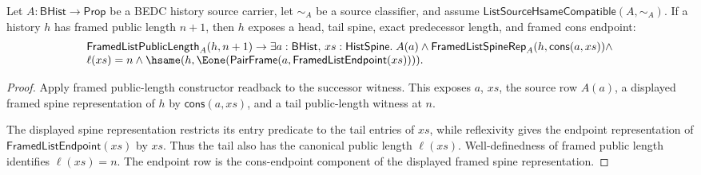 \begin{theorem}
\label{thm:list-public-length-successor-endpoint-readback}
Let $A:\mathsf{BHist}\to\mathsf{Prop}$ be a BEDC history source carrier, let
$\sim_A$ be a source classifier, and assume
$\mathsf{ListSourceHsameCompatible}(A,\sim_A)$. If a history $h$ has framed
public length \(n+1\), then \(h\) exposes a head, tail spine, exact predecessor
length, and framed cons endpoint:
$$
\begin{array}{l}
\mathsf{FramedListPublicLength}_A(h,n+1)\to
\exists a:\mathsf{BHist},\,xs:\mathsf{HistSpine}.\;
A(a)\land
\mathsf{FramedListSpineRep}_A(h,\mathsf{cons}(a,xs))\land\\
\ell(xs)=n\land
\hsame(h,\Eone(\mathsf{PairFrame}(a,\mathsf{FramedListEndpoint}(xs)))).
\end{array}
$$
\end{theorem}
\begin{proof}
Apply framed public-length constructor readback to the successor witness. This
exposes \(a\), \(xs\), the source row \(A(a)\), a displayed framed spine
representation of \(h\) by \(\mathsf{cons}(a,xs)\), and a tail public-length
witness at \(n\).

The displayed spine representation restricts its entry predicate to the tail
entries of \(xs\), while reflexivity gives the endpoint representation of
\(\mathsf{FramedListEndpoint}(xs)\) by \(xs\). Thus the tail also has the
canonical public length \(\ell(xs)\). Well-definedness of framed public length
identifies \(\ell(xs)=n\). The endpoint row is the cons-endpoint component of
the displayed framed spine representation.
\end{proof}
